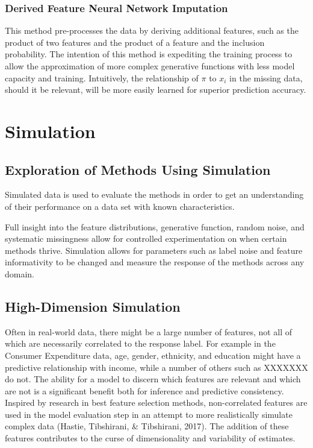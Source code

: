 \documentclass[12pt,twoside]{reedthesis}
\begin{document}
\subsection{Derived Feature Neural Network
Imputation}\label{derived-feature-neural-network-imputation}

This method pre-processes the data by deriving additional features, such
as the product of two features and the product of a feature and the
inclusion probability. The intention of this method is expediting the
training process to allow the approximation of more complex generative
functions with less model capacity and training. Intuitively, the
relationship of \(\pi\) to \(x_i\) in the missing data, should it be
relevant, will be more easily learned for superior prediction accuracy.

\chapter{Simulation}\label{simulation}

\section{Exploration of Methods Using
Simulation}\label{exploration-of-methods-using-simulation}

Simulated data is used to evaluate the methods in order to get an
understanding of their performance on a data set with known
characteristics.

Full insight into the feature distributions, generative function, random
noise, and systematic missingness allow for controlled experimentation
on when certain methods thrive. Simulation allows for parameters such as
label noise and feature informativity to be changed and measure the
response of the methods across any domain.

\section{High-Dimension Simulation}\label{high-dimension-simulation}

Often in real-world data, there might be a large number of features, not
all of which are necessarily correlated to the response label. For
example in the Consumer Expenditure data, age, gender, ethnicity, and
education might have a predictive relationship with income, while a
number of others such as XXXXXXX do not. The ability for a model to
discern which features are relevant and which are not is a significant
benefit both for inference and predictive consistency. Inspired by
research in best feature selection methods, non-correlated features are
used in the model evaluation step in an attempt to more realistically
simulate complex data (Hastie, Tibshirani, \& Tibshirani, 2017). The
addition of these features contributes to the curse of dimensionality
and variability of estimates.
\end{document}
